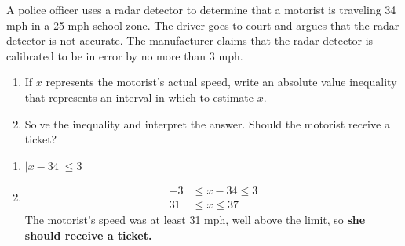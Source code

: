 \documentclass{ximera}
\begin{document}
\begin{problem}
A police officer uses a radar detector to determine that a motorist is traveling 34 mph in a 25-mph school zone. The driver goes to court and argues that the radar detector is not accurate. The manufacturer claims that the radar detector is calibrated to be in error by no more than 3 mph.
\begin{enumerate}
  \item[(a)] If $x$ represents the motorist's actual speed, write an absolute value inequality that represents an interval in which to estimate $x$.
  \medskip
  \item[(b)] Solve the inequality and interpret the answer. Should the motorist receive a ticket?
\end{enumerate}

\begin{solution}
\begin{enumerate}
  \item[(a)] $|x - 34| \leq 3$

  \item[(b)] \begin{align*}
    -3 &\leq x-34 \leq 3\\
    31 &\leq x \leq 37
  \end{align*}
  The motorist's speed was at least 31 mph, well above the limit, so \textbf{she should receive a ticket.}
\end{enumerate}
\end{solution}
\end{problem}
\end{document}
